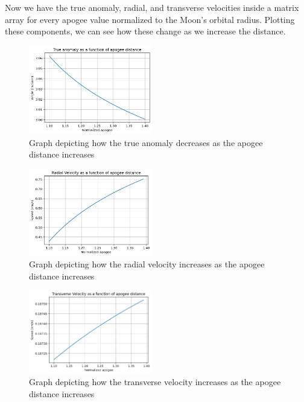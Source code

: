 \documentclass[12pt,twocolumn]{article}  %
\begin{document}
Now we have the true anomaly, radial, and
transverse velocities inside a matrix array for
every apogee value normalized to the Moon's
orbital radius. Plotting these components,
we can see how these change as we increase
the distance.


\begin{figure}[H]
    \centering
    \includegraphics[width=0.48\textwidth]{Images/221-theta.png}
    \caption{Graph depicting how the true anomaly decreases as the
    apogee distance increases
    }
\end{figure}


\begin{figure}[H]
    \centering
    \includegraphics[width=0.48\textwidth]{Images/221-rad.png}
    \caption{Graph depicting how the radial velocity increases as the
    apogee distance increases}
\end{figure}


\begin{figure}[H]
    \centering
    \includegraphics[width=0.48\textwidth]{Images/221-trans.png}
    \caption{Graph depicting how the transverse velocity increases as the
    apogee distance increases}
\end{figure}
\end{document}
